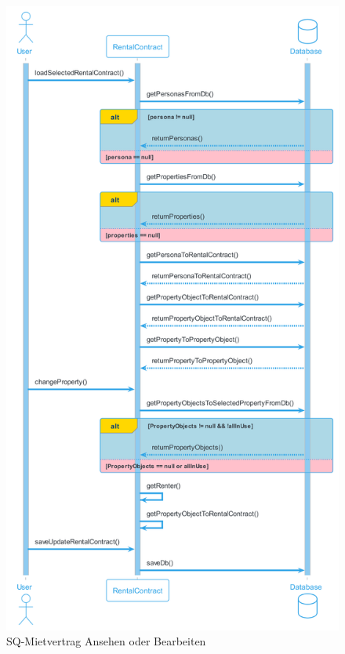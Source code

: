 \begin{figure}[H]
  \begin{center}
    \includegraphics[height=1\textheight]{content/diagrams/out/sequenzdiagram/mietvertragEditieren/mietvertragEditieren.png}
    \caption{SQ-Mietvertrag Ansehen oder Bearbeiten}

  \end{center}
\end{figure}

